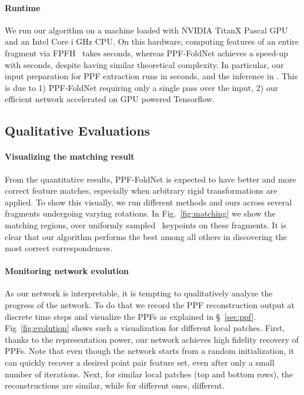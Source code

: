 \paragraph{Runtime} We run our algorithm on a machine loaded with NVIDIA TitanX Pascal GPU and an Intel Core i GHz CPU. On this hardware, computing features of an entire fragment via FPFH~\cite{fpfh} takes  seconds, whereas PPF-FoldNet achieves a  speed-up with  seconds, despite having similar theoretical complexity. In particular, our input preparation for PPF extraction runs in  seconds, and the inference in . This is due to 1) PPF-FoldNet requiring only a single pass over the input, 2) our efficient network accelerated on GPU powered Tensorflow.
\subsection{Qualitative Evaluations} 
\label{sec:qualeval}
\paragraph{Visualizing the matching result} From the quantitative results, PPF-FoldNet is expected to have better and more correct feature matches, especially when arbitrary rigid transformations are applied. To show this visually, we run different methods and ours across several fragments undergoing varying rotations. In Fig.~\ref{fig:matching} we show the matching regions, over uniformly sampled~\cite{birdal2017sampling} keypoints on these fragments. It is clear that our algorithm performs the best among all others in discovering the most correct correspondences.
\paragraph{Monitoring network evolution} As our network is interpretable, it is tempting to qualitatively analyze the progress of the network. To do that we record the PPF reconstruction output at discrete time steps and visualize the PPFs as explained in §~\ref{sec:ppf}. Fig~\ref{fig:evolution} shows such a visualization for different local patches. First, thanks to the representation power, our network achieves high fidelity recovery of PPFs. Note that even though the network starts from a random initialization, it can quickly recover a desired point pair feature set, even after only a small number of iterations. Next, for similar local patches (top and bottom rows), the reconstructions are similar, while for different ones, different. 

